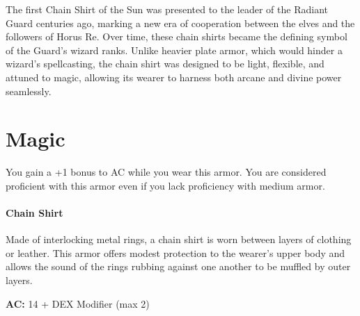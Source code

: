 The first Chain Shirt of the Sun was presented to the leader of the Radiant Guard centuries ago, marking a new era of cooperation between the elves and the followers of Horus Re. Over time, these chain shirts became the defining symbol of the Guard's wizard ranks. Unlike heavier plate armor, which would hinder a wizard's spellcasting, the chain shirt was designed to be light, flexible, and attuned to magic, allowing its wearer to harness both arcane and divine power seamlessly.

\section*{Magic}
You gain a +1 bonus to AC while you wear this armor. You are considered proficient with this armor even if you lack proficiency with medium armor.

\paragraph*{Chain Shirt} Made of interlocking metal rings, a chain shirt is worn between layers of clothing or leather. This armor offers modest protection to the wearer's upper body and allows the sound of the rings rubbing against one another to be muffled by outer layers.

\noindent \textbf{AC:} 14 + DEX Modifier (max 2)